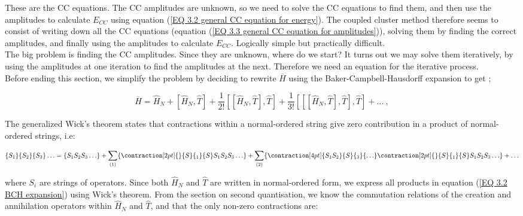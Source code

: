 	These are the CC equations. The CC amplitudes are unknown, so we need to solve the CC equations to find them, and then use the amplitudes to calculate $E_{CC}$ using equation (\ref{EQ 3.2 general CC equation for energy}). The coupled cluster method therefore seems to consist of writing down all the CC equations (equation (\ref{EQ 3.3 general CC equation for amplitudes})), solving them by finding the correct amplitudes, and finally using the amplitudes to calculate $E_{CC}$. Logically simple but practically difficult.\\
	
	The big problem is finding the CC amplitudes. Since they are unknown, where do we start? It turns out we may solve them iteratively, by using the amplitudes at one iteration to find the amplitudes at the next. Therefore we need an equation for the iterative process.\\
	
	Before ending this section, we simplify the problem by deciding to rewrite $\overbar{H}$ using the Baker-Campbell-Hausdorff expansion to get \cite{ShavittBartlett09};
	
	\begin{equation}
		\overbar{H} = \hat{H}_N + \left[ \hat{H}_N,\hat{T} \right] + \frac{1}{2!}\left[\left[ \hat{H}_N,\hat{T} \right],\hat{T}\right] + \frac{1}{3!}\left[\left[ \left[\hat{H}_N,\hat{T} \right],\hat{T}\right],\hat{T}\right] + \ldots\:,
		\label{EQ 3.2 BCH expansion}
	\end{equation}
	
	The generalized Wick's theorem states that contractions within a normal-ordered string give zero contribution in a product of normal-ordered strings, i.e:
	
	\begin{equation}
		\{S_1\}\{S_2\}\{S_3\}\ldots = \{S_1S_2S_3\ldots\} + \sum_{\text{(1)}}\{\contraction[2pt]{}{S}{{}_1}{S}S_1S_2S_3\ldots\} + \sum_{\text{(2)}}\{\contraction[4pt]{S_1S_2}{S}{{}_3}{\ldots}\contraction[2pt]{}{S}{{}_1}{S}S_1S_2S_3\ldots\} + \ldots
	\end{equation}
	
	\noindent where $S_i$ are strings of operators. Since both $\hat{H}_N$ and $\hat{T}$ are written in normal-ordered form, we express all products in equation (\ref{EQ 3.2 BCH expansion}) using Wick's theorem. From the section on second quantisation, we know the commutation relations of the creation and annihilation operators within $\hat{H}_N$ and $\hat{T}$, and that the only non-zero contractions are:
	
